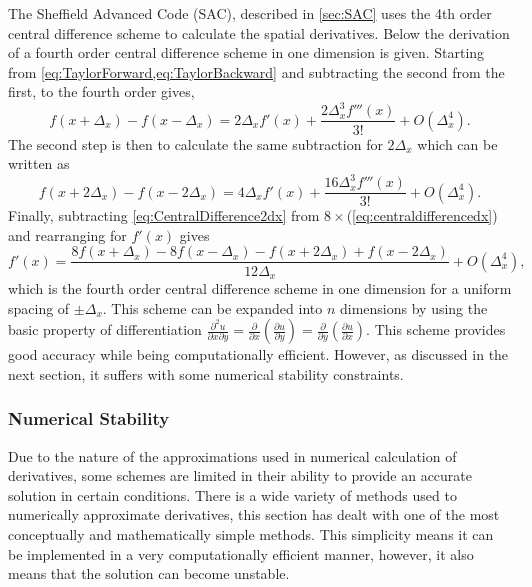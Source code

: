 The Sheffield Advanced Code (SAC), described in \cref{sec:SAC} uses the 4th order central difference scheme to calculate the spatial derivatives.
Below the derivation of a fourth order central difference scheme in one dimension is given.
Starting from \cref{eq:TaylorForward,eq:TaylorBackward} and subtracting the second from the first, to the fourth order gives,
\begin{equation}
f(x+\Delta_{x})-f(x-\Delta_{x})=2\Delta_{x}f'(x)+\frac{2\Delta_{x}^{3}f'''(x)}{3!}+O(\Delta_{x}^{4}).\label{eq:centraldifferencedx}
\end{equation}
The second step is then to calculate the same subtraction for $2\Delta_{x}$ which can be written as
\begin{equation}
f(x+2\Delta_{x})-f(x-2\Delta_{x})=4\Delta_{x}f'(x)+\frac{16\Delta_{x}^{3}f'''(x)}{3!}+O(\Delta_{x}^{4}).\label{eq:CentralDifference2dx}
\end{equation}
Finally, subtracting \cref{eq:CentralDifference2dx} from $8\times$(\cref{eq:centraldifferencedx}) and rearranging for $f'(x)$ gives
\begin{equation}
f'(x)=\frac{8f(x+\Delta_{x})-8f(x-\Delta_{x})-f(x+2\Delta_{x})+f(x-2\Delta_{x})}{12\Delta_{x}}+O(\Delta_{x}^{4}),\label{eq:4thOrderCentralDifferenceUniform}
\end{equation}
which is the fourth order central difference scheme in one dimension for a uniform spacing of $\pm\Delta_{x}$.
This scheme can be expanded into $n$ dimensions by using the basic property of differentiation $\frac{\partial^{2}u}{\partial x\partial y}=\frac{\partial}{\partial x}\left(\frac{\partial u}{\partial y}\right)=\frac{\partial}{\partial y}\left(\frac{\partial u}{\partial x}\right)$.
This scheme provides good accuracy while being computationally efficient.
However, as discussed in the next section, it suffers with some numerical stability constraints.


\subsubsection{Numerical Stability}

Due to the nature of the approximations used in numerical calculation of derivatives, some schemes are limited in their ability to provide an accurate solution in certain conditions.
There is a wide variety of methods used to numerically approximate derivatives, this section has dealt with one of the most conceptually and mathematically simple methods.
This simplicity means it can be implemented in a very computationally efficient manner, however, it also means that the solution can become unstable.

